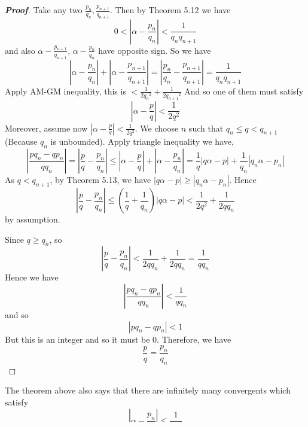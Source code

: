 \begin{proof}[\bf Proof] Take any two $\frac{p_n}{q_n},\frac{p_{n+1}}{q_{n+1}}$. Then by Theorem 5.12 we have
$$0<\left|\alpha-\frac{p_n}{q_n}\right|<\frac{1}{q_n q_{n+1}}$$
and also $\alpha-\frac{p_{n+1}}{q_{n+1}}$, $\alpha-\frac{p_n}{q_n}$ have opposite sign.
So we have
$$\left|\alpha-\frac{p_n}{q_n}\right|+\left|\alpha-\frac{p_{n+1}}{q_{n+1}}\right|
=\left|\frac{p_n}{q_n}-\frac{p_{n+1}}{q_{n+1}}\right| = \frac{1}{q_n q_{n+1}}$$
Apply AM-GM inequality, this is $< \frac{1}{2{q_n}^2}+\frac{1}{2{q_{n+1}}^2}$
And so one of them must satisfy
$$\left|\alpha-\frac{p}{q}\right| < \frac{1}{2q^2}$$
Moreover, assume now $|\alpha-\frac{p}{q}| < \frac{1}{2q^2}$. We choose $n$ such that
$q_n \le q < q_{n+1}$ (Because $q_n$ is unbounded). Apply triangle inequality we have,
$$\left|\frac{pq_n-qp_n}{qq_n}\right|
=\left|\frac{p}{q}-\frac{p_n}{q_n}\right| \le \left|\alpha - \frac{p}{q}\right|
+\left|\alpha-\frac{p_n}{q_n}\right| =\frac{1}{q}\left|q\alpha -p\right|+
\frac{1}{q_n}\left|q_n \alpha -p_n\right|$$
As $q<q_{n+1}$, by Theorem 5.13, we have $|q\alpha-p| \ge |q_n \alpha-p_n|$. Hence
$$\left|\frac{p}{q}-\frac{p_n}{q_n}\right| \le \left(\frac{1}{q}+\frac{1}{q_n}\right)\left|q\alpha-p\right|
< \frac{1}{2q^2}+\frac{1}{2qq_n}$$
by assumption.

Since $q \ge q_n$, so
$$\left|\frac{p}{q}-\frac{p_n}{q_n}\right| < \frac{1}{2qq_n}+\frac{1}{2qq_n}
=\frac{1}{qq_n}$$
Hence we have
$$\left|\frac{pq_n-qp_n}{qq_n}\right| < \frac{1}{qq_n}$$
and so
$$\left|pq_n-qp_n\right|<1$$ But this is an integer and so it must be $0$.
Therefore, we have
$$\frac{p}{q}=\frac{p_n}{q_n}$$
\end{proof}
The theorem above also says that there are infinitely many convergents which satisfy
$$\left|\alpha-\frac{p_n}{q_n}\right| \le \frac{1}{2q^2_n}$$
But the fraction $\frac{1}{2}$ is not best possible and we can in fact improve this by:
\begin{theorem}{\bf [Hurwitz]}\label{H;Hurwitz} There are infinitely many convergents of an irrational
$\alpha$ which satisfies
$$\left|\alpha-\frac{p_n}{q_n}\right| < \frac{1}{b^2_n \sqrt{5}}$$
\end{theorem}
The proof is similar to Theorem 5.15 and is left an exercise to the reader (see Exercise 4 of this chapter). But the fraction $\sqrt{5}$ in the theorem can not be improved as we have the following theorem:
\begin{theorem} There exists a real number $\gamma$ with the property: if $\theta > \sqrt{5}$ then the inequality
$$\left|\gamma-\frac{p}{q}\right| <\frac{1}{q^2 \theta}$$
has only finitely many rational solutions $\frac{p}{q}$.
\end{theorem}
